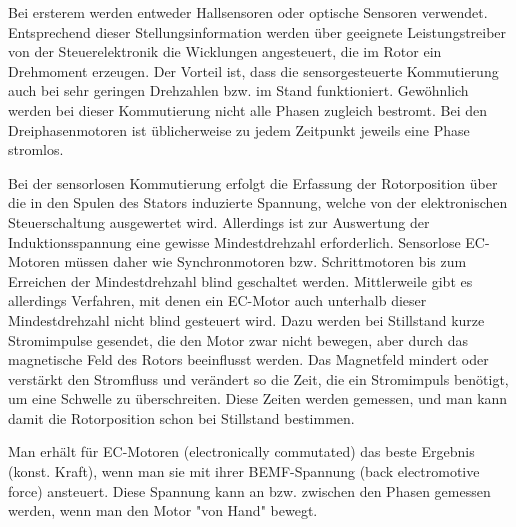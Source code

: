 \begin{description}[leftmargin=3cm]
							\item[Sensorgesteuerte Kommutierung]
							Bei ersterem werden entweder Hallsensoren oder optische Sensoren verwendet.	Entsprechend dieser Stellungsinformation werden über geeignete Leistungstreiber von der Steuerelektronik die Wicklungen angesteuert, die im Rotor ein Drehmoment erzeugen. Der Vorteil ist, dass die sensorgesteuerte Kommutierung auch bei sehr geringen Drehzahlen bzw. im Stand funktioniert. Gewöhnlich werden bei dieser Kommutierung nicht alle Phasen zugleich bestromt. Bei den Dreiphasenmotoren ist üblicherweise zu jedem Zeitpunkt jeweils eine Phase stromlos.
							
							\item[Sensorlose Kommutierung]
							Bei der sensorlosen Kommutierung erfolgt die Erfassung der Rotorposition über die in den Spulen des Stators induzierte Spannung, welche von der elektronischen Steuerschaltung ausgewertet wird. Allerdings ist zur Auswertung der Induktionsspannung eine gewisse Mindestdrehzahl erforderlich. Sensorlose EC-Motoren müssen daher wie Synchronmotoren bzw. Schrittmotoren bis zum Erreichen der Mindestdrehzahl blind geschaltet werden.
							Mittlerweile gibt es allerdings Verfahren, mit denen ein EC-Motor auch unterhalb dieser Mindestdrehzahl nicht blind gesteuert wird. Dazu werden bei Stillstand kurze Stromimpulse gesendet, die den Motor zwar nicht bewegen, aber durch das magnetische Feld des Rotors beeinflusst werden. Das Magnetfeld mindert oder verstärkt den Stromfluss und verändert so die Zeit, die ein Stromimpuls benötigt, um eine Schwelle zu überschreiten. Diese Zeiten werden gemessen, und man kann damit die Rotorposition schon bei Stillstand bestimmen.
							
							\item[Geeignetste Kommutierung]
							Man erhält für EC-Motoren (electronically commutated) das beste Ergebnis (konst. Kraft), wenn man sie mit ihrer BEMF-Spannung (back electromotive force) ansteuert. Diese Spannung kann an bzw. zwischen den Phasen gemessen werden, wenn man den Motor "von Hand" bewegt.
							

\end{description}
